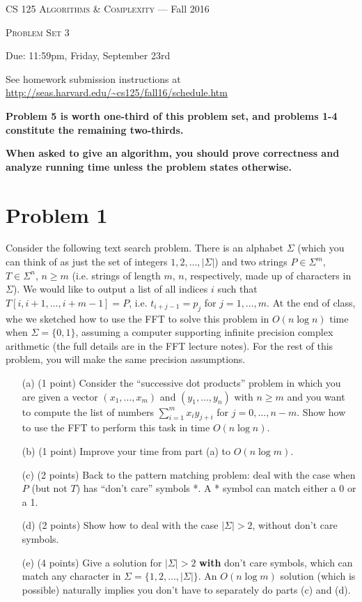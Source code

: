 \documentclass[12pt]{article}
\begin{document}
\thispagestyle{empty}

\begin{center}
{\Large \textsc{CS 125 Algorithms \& Complexity} --- Fall 2016}

\bigskip

{\Large \textsc{Problem Set 3}}

\smallskip

Due: 11:59pm, Friday, September 23rd

\bigskip

{\footnotesize See homework submission instructions at \url{http://seas.harvard.edu/~cs125/fall16/schedule.htm}}
\end{center}

\textbf{Problem 5 is worth one-third of this problem set, and problems 1-4 constitute the remaining two-thirds.}

\bigskip

\textbf{When asked to give an algorithm, you should prove correctness and analyze running time unless the problem states otherwise.}

\section*{Problem 1}

Consider the following text search problem. There is an alphabet $\Sigma$ (which you can think of as just the set of integers $1,2,\ldots,|\Sigma|$) and two strings $P \in \Sigma^m$, $T\in \Sigma^n$, $n\ge m$ (i.e. strings of length $m$, $n$, respectively, made up of characters in $\Sigma$). We would like to output a list of all indices $i$ such that $T[i,i+1,\ldots,i+m-1]=P$, i.e. $t_{i+j-1}=p_j$ for $j=1,\ldots,m$. At the end of class, whe we sketched how to use the FFT to solve this problem in $O(n\log n)$ time when $\Sigma = \{0,1\}$, assuming a computer supporting infinite precision complex arithmetic (the full details are in the FFT lecture notes). For the rest of this problem, you will make the same precision assumptions.

\begin{itemize}
\item[(a)] (1 point) Consider the ``successive dot products'' problem in which you are given a vector $(x_1,\ldots,x_m)$ and $(y_1,\ldots,y_n)$ with $n\ge m$ and you want to compute the list of numbers $\sum_{i=1}^m x_i y_{j+i}$ for $j=0,\ldots,n-m$. Show how to use the FFT to perform this task in time $O(n\log n)$.
\item[(b)] (1 point)  Improve your time from part (a) to $O(n\log m)$.
\item[(c)] (2 points)  Back to the pattern matching problem: deal with the case when $P$ (but not $T$) has ``don't care'' symbols *. A * symbol can match either a 0 or a 1.
\item[(d)] (2 points)  Show how to deal with the case $|\Sigma|>2$, without don't care symbols.
\item[(e)] (4 points) Give a solution for $|\Sigma|>2$ {\bf with} don't care symbols, which can match any character in $\Sigma=\{1,2,\ldots,|\Sigma|\}$. An $O(n\log m)$ solution (which is possible) naturally implies you don't have to separately do parts (c) and (d).
\end{itemize}
\end{document}

